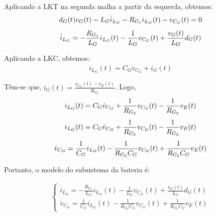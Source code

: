 \documentclass{article}
\newcommand{\nle}{%
  \notag \\[4pt]
}
\begin{document}
Aplicando a LKT na segunda malha a partir da esquerda, obtemos:
\begin{gather}
  d_G(t) v_G(t) - L_G \dot{i}_{L_G} - R_{G_1} i_{L_G}(t) - v_{C_G}(t) = 0 \nle
  \dot{i}_{L_G} = - \frac{R_{G_1}}{L_G} i_{L_G}(t) - \frac{1}{L_G} v_{C_G}(t) + \frac{v_G(t)}{L_G} d_G(t)
\end{gather}

Aplicando a LKC, obtemos:
\begin{gather}
  i_{L_G}(t) = C_G \dot{v}_{C_G} + i_G(t)
\end{gather}

Têm-se que, $i_G(t) = \frac{v_{C_G}(t) - v_E(t)}{R_{G_2}}$. Logo,
\begin{gather}
  i_{L_G}(t) = C_G \dot{v}_{C_G} + \frac{1}{R_{G_2}}v_{C_G}(t) - \frac{1}{R_{G_2}} v_E(t) \nle
  i_{L_G}(t) = C_G \dot{v}_{C_G} + \frac{1}{R_{G_2}}v_{C_G}(t) - \frac{1}{R_{G_2}} v_E(t) \nle
  \dot{v}_{C_G} = \frac{1}{C_G} i_{L_G}(t) - \frac{1}{R_{G_2}C_G }v_{C_G}(t) + \frac{1}{R_{G_2} C_G} v_E(t)
\end{gather}

Portanto, o modelo do subsistema da bateria é:

\begin{gather}
  \begin{cases}
    \dot{i}_{L_G} = \displaystyle - \frac{R_{G_1}}{L_G} i_{L_G}(t) - \frac{1}{L_G} v_{C_G}(t) + \frac{v_G(t)}{L_G} d_G(t) \\[12pt]
    \dot{v}_{C_G} = \displaystyle \frac{1}{C_G} i_{L_G}(t) - \frac{1}{R_{G_2}C_G }v_{C_G}(t) + \frac{1}{R_{G_2} C_G} v_E(t)
  \end{cases}
\end{gather}
\end{document}
